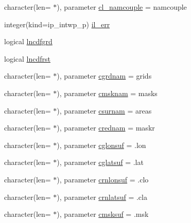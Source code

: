 \begin{DoxyCompactItemize}
\item 
character(len= $\ast$), parameter \hyperlink{namespacemod__oasis__namcouple_ae023a43e29bb32ebf11f193e34d8bd85}{cl\+\_\+namcouple} = \textquotesingle{}namcouple\textquotesingle{}
\item 
integer(kind=ip\+\_\+intwp\+\_\+p) \hyperlink{namespacemod__oasis__namcouple_a18b7a14f095f3cb6ace40afc06e2a5b9}{il\+\_\+err}
\item 
logical \hyperlink{namespacemod__oasis__namcouple_a5d6add8b958acc8b865b898d9e54ac73}{lncdfgrd}
\item 
logical \hyperlink{namespacemod__oasis__namcouple_a645168dae20a0c24786c3e6dcea9f2ab}{lncdfrst}
\item 
character(len= $\ast$), parameter \hyperlink{namespacemod__oasis__namcouple_a6550ad2692a6520d9d32776d63e6ed55}{cgrdnam} = \textquotesingle{}grids\textquotesingle{}
\item 
character(len= $\ast$), parameter \hyperlink{namespacemod__oasis__namcouple_a29b8cbc6b088d00d249b654bd27b9a1f}{cmsknam} = \textquotesingle{}masks\textquotesingle{}
\item 
character(len= $\ast$), parameter \hyperlink{namespacemod__oasis__namcouple_aeda2e47deb9277960f4c93a6a13b0154}{csurnam} = \textquotesingle{}areas\textquotesingle{}
\item 
character(len= $\ast$), parameter \hyperlink{namespacemod__oasis__namcouple_ab4734950f9668a5963529abde7f140e1}{crednam} = \textquotesingle{}maskr\textquotesingle{}
\item 
character(len= $\ast$), parameter \hyperlink{namespacemod__oasis__namcouple_a567386ecec7dd84b0118f58d83be4dc7}{cglonsuf} = \textquotesingle{}.lon\textquotesingle{}
\item 
character(len= $\ast$), parameter \hyperlink{namespacemod__oasis__namcouple_abe6c8d1cffb890fb291b1365bd331c54}{cglatsuf} = \textquotesingle{}.lat\textquotesingle{}
\item 
character(len= $\ast$), parameter \hyperlink{namespacemod__oasis__namcouple_ad4cb94d4f381883a5e238f76d35a1d7d}{crnlonsuf} = \textquotesingle{}.clo\textquotesingle{}
\item 
character(len= $\ast$), parameter \hyperlink{namespacemod__oasis__namcouple_a01ddb33a9647852321bb5b3fed99f74d}{crnlatsuf} = \textquotesingle{}.cla\textquotesingle{}
\item 
character(len= $\ast$), parameter \hyperlink{namespacemod__oasis__namcouple_aea73257d04086fa6a1ddff0baa72cb34}{cmsksuf} = \textquotesingle{}.msk\textquotesingle{}
\item 

\end{DoxyCompactItemize}

